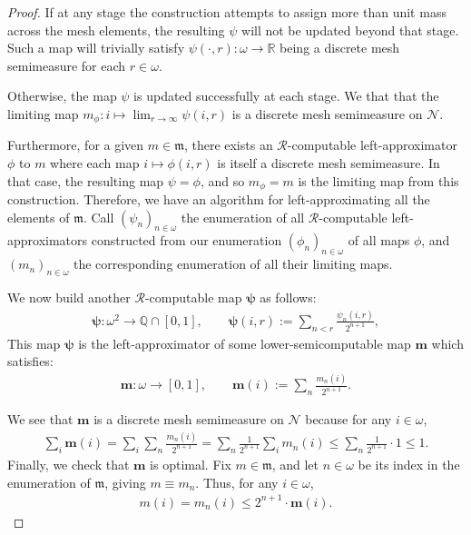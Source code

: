 \begin{proof}
    If at any stage the construction attempts to assign more than unit mass across the mesh elements, the resulting $\psi$ will not be updated beyond that stage. Such a map will trivially satisfy $\psi(\cdot, r) : \omega \to \mathbb{R}$ being a discrete mesh semimeasure for each $r \in \omega$. 

    Otherwise, the map $\psi$ is updated successfully at each stage. We that that the limiting map $m_\phi : i \mapsto \lim_{r \to \infty} \psi(i, r)$ is a discrete mesh semimeasure on $\mathcal{N}$.

    Furthermore, for a given $m \in \mathfrak{m}$, there exists an $\mathscr{R}$-computable left-approximator $\phi$ to $m$ where each map $i \mapsto \phi(i, r)$ is itself a discrete mesh semimeasure. In that case, the resulting map $\psi = \phi$, and so $m_\phi = m$ is the limiting map from this construction. Therefore, we have an algorithm for left-approximating all the elements of $\mathfrak{m}$. Call $(\psi_n)_{n \in \omega}$ the enumeration of all $\mathscr{R}$-computable left-approximators constructed from our enumeration $(\phi_n)_{n \in \omega}$ of all maps $\phi$, and $(m_n)_{n \in \omega}$ the corresponding enumeration of all their limiting maps. 

    We now build another $\mathscr{R}$-computable map $\boldsymbol{\psi}$ as follows:
    \begin{align*}
         \boldsymbol{\psi} : \omega^2 \to \mathbb{Q} \cap [0,1], \qquad \boldsymbol{\psi}(i, r) := \sum_{n < r} \frac{\psi_n(i, r)}{2^{n + 1}},
    \end{align*}
    This map $\boldsymbol{\psi}$ is the left-approximator of some lower-semicomputable map $\mathbf{m}$ which satisfies:
    \begin{align*}
        \mathbf{m}: \omega \to [0, 1], \qquad \mathbf{m}(i) := \sum_n \frac{m_n(i)}{2^{n + 1}}.
    \end{align*}
    
    We see that $\mathbf{m}$ is a discrete mesh semimeasure on $\mathcal{N}$ because for any $i \in \omega$,
    \begin{align*}
        \sum_i \mathbf{m}(i) = \sum_i \sum_n \frac{m_n(i)}{2^{n + 1}} = \sum_n \frac{1}{2^{n + 1}} \sum_i m_n(i) \leq \sum_n \frac{1}{2^{n + 1}} \cdot 1 \leq 1.
    \end{align*}
    Finally, we check that $\mathbf{m}$ is optimal. Fix $m \in \mathfrak{m}$, and let $n \in \omega$ be its index in the enumeration of $\mathfrak{m}$, giving $m \equiv m_n$. Thus, for any $i \in \omega$,
    \begin{align*}
        m(i) = m_n(i) \leq 2^{n + 1} \cdot \mathbf{m}(i).
    \end{align*}    
\end{proof}

